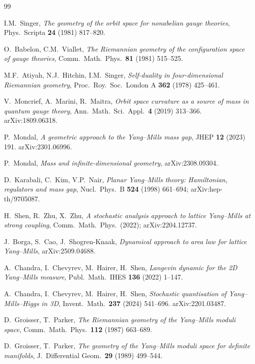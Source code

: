 \documentclass[11pt,letterpaper]{article}
\theoremstyle{definition}
\begin{document}
\begin{thebibliography}{99}

 I.M.\ Singer, \emph{The geometry of the orbit space for nonabelian gauge theories}, Phys.\ Scripta \textbf{24} (1981) 817--820.

 O.\ Babelon, C.M.\ Viallet, \emph{The Riemannian geometry of the configuration space of gauge theories}, Comm.\ Math.\ Phys.\ \textbf{81} (1981) 515--525.

 M.F.\ Atiyah, N.J.\ Hitchin, I.M.\ Singer, \emph{Self-duality in four-dimensional Riemannian geometry}, Proc.\ Roy.\ Soc.\ London A \textbf{362} (1978) 425--461.

 V.\ Moncrief, A.\ Marini, R.\ Maitra, \emph{Orbit space curvature as a source of mass in quantum gauge theory}, Ann.\ Math.\ Sci.\ Appl.\ \textbf{4} (2019) 313--366. arXiv:1809.06318.

 P.\ Mondal, \emph{A geometric approach to the Yang--Mills mass gap}, JHEP \textbf{12} (2023) 191. arXiv:2301.06996.

 P.\ Mondal, \emph{Mass and infinite-dimensional geometry}, arXiv:2308.09304.

 D.\ Karabali, C.\ Kim, V.P.\ Nair, \emph{Planar Yang--Mills theory: Hamiltonian, regulators and mass gap}, Nucl.\ Phys.\ B \textbf{524} (1998) 661--694; arXiv:hep-th/9705087.

 H.\ Shen, R.\ Zhu, X.\ Zhu, \emph{A stochastic analysis approach to lattice Yang--Mills at strong coupling}, Comm.\ Math.\ Phys.\ (2022); arXiv:2204.12737.

 J.\ Borga, S.\ Cao, J.\ Shogren-Knaak, \emph{Dynamical approach to area law for lattice Yang--Mills}, arXiv:2509.04688.

 A.\ Chandra, I.\ Chevyrev, M.\ Hairer, H.\ Shen, \emph{Langevin dynamic for the 2D Yang--Mills measure}, Publ.\ Math.\ IHES \textbf{136} (2022) 1--147.

 A.\ Chandra, I.\ Chevyrev, M.\ Hairer, H.\ Shen, \emph{Stochastic quantisation of Yang--Mills--Higgs in 3D}, Invent.\ Math.\ \textbf{237} (2024) 541--696. arXiv:2201.03487.

 D.\ Groisser, T.\ Parker, \emph{The Riemannian geometry of the Yang--Mills moduli space}, Comm.\ Math.\ Phys.\ \textbf{112} (1987) 663--689.

 D.\ Groisser, T.\ Parker, \emph{The geometry of the Yang--Mills moduli space for definite manifolds}, J.\ Differential Geom.\ \textbf{29} (1989) 499--544.


\end{thebibliography}
\end{document}
